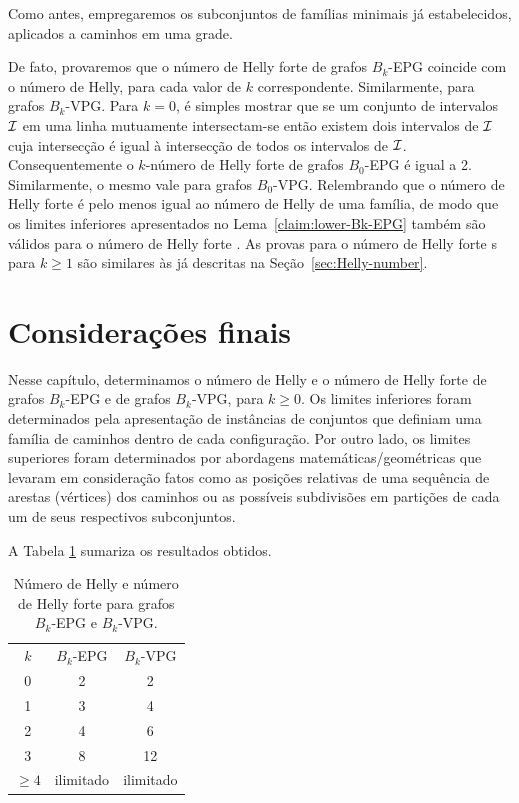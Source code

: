 Como antes, empregaremos os subconjuntos de famílias minimais já estabelecidos, aplicados a caminhos em uma grade.

De fato, provaremos que o número de Helly forte  de grafos $B_k$-EPG  coincide com o número de Helly, para cada valor de  $k$ correspondente. Similarmente, para grafos $B_k$-VPG. Para $k=0$, é  simples mostrar que se um conjunto de intervalos  $\cal I$ em uma linha mutuamente intersectam-se então existem dois intervalos de $\cal I$ cuja intersecção é igual à intersecção de todos os intervalos de $\cal I$. Consequentemente o $k$-número de Helly forte  de grafos $B_0$-EPG é igual a 2. 
Similarmente, o mesmo vale para grafos $B_0$-VPG. 
Relembrando que o número de Helly forte é pelo menos igual ao número de Helly de uma família, de modo que os limites inferiores apresentados  no Lema~\ref{claim:lower-Bk-EPG} também são válidos para o  número de Helly forte . As provas para o número de Helly forte s para $k \geq 1$ são similares às já descritas na Seção~\ref{sec:Helly-number}.  



\section{Considerações finais}\label{sec:finalRemarks4}

Nesse capítulo, determinamos o  número de Helly e o número de Helly forte  de grafos $B_k$-EPG e de grafos $B_k$-VPG, para $k \geq 0$. Os limites inferiores foram determinados pela apresentação de instâncias de conjuntos que definiam uma família de caminhos dentro de cada configuração. Por outro lado, os limites superiores foram determinados por abordagens matemáticas/geométricas que levaram em consideração fatos como as posições relativas de uma sequência de arestas (vértices) dos caminhos ou as possíveis subdivisões em partições de cada um de seus respectivos subconjuntos.

A Tabela \ref{tab:Helly-Strong-Helly} sumariza os resultados obtidos.
 
\Large 

\begin{table}[htb]
    \centering
    \begin{tabular}{c|c|c}
    \cline{1-3} $k$  & $B_k$-EPG & $B_k$-VPG \\
    \cline{1-3} 0 & 2 & 2 \\
    \cline{1-3} 1 & 3 & 4 \\
    \cline{1-3} 2 & 4 & 6 \\
    \cline{1-3} 3 & 8 & 12 \\
    \cline{1-3} $\geq 4$ & ilimitado & ilimitado \\
    \cline{1-3} 
    \end{tabular}
    \caption{Número de Helly e número de Helly forte para grafos $B_k$-EPG e $B_k$-VPG.}
    \label{tab:Helly-Strong-Helly}
\end{table}

